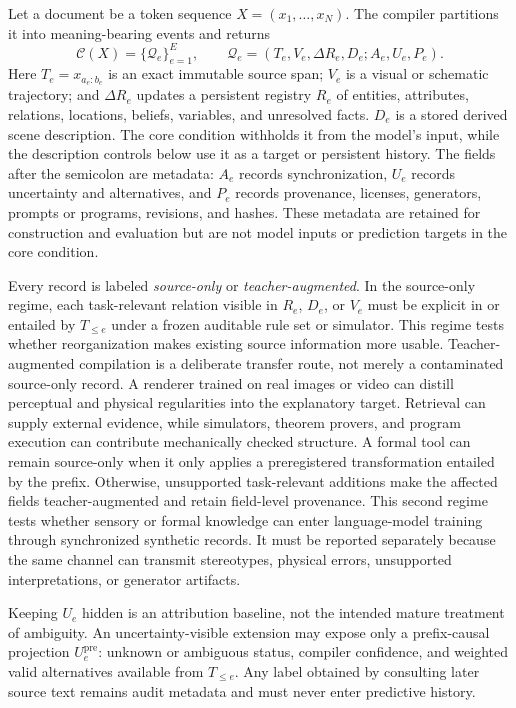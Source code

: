 \documentclass[11pt]{article}
\newcommand{\record}{\mathcal{Q}}
\newcommand{\compiler}{\mathcal{C}}
\begin{document}
Let a document be a token sequence $X=(x_1,\ldots,x_N)$. The compiler partitions it into meaning-bearing events and returns
\begin{equation}
  \compiler(X)=\{\record_e\}_{e=1}^{E}, \qquad
  \record_e=(T_e,V_e,\Delta R_e,D_e;A_e,U_e,P_e).
  \label{eq:record}
\end{equation}
Here $T_e=x_{a_e:b_e}$ is an exact immutable source span; $V_e$ is a visual or schematic trajectory; and $\Delta R_e$ updates a persistent registry $R_e$ of entities, attributes, relations, locations, beliefs, variables, and unresolved facts. $D_e$ is a stored derived scene description. The core condition withholds it from the model's input, while the description controls below use it as a target or persistent history. The fields after the semicolon are metadata: $A_e$ records synchronization, $U_e$ records uncertainty and alternatives, and $P_e$ records provenance, licenses, generators, prompts or programs, revisions, and hashes. These metadata are retained for construction and evaluation but are not model inputs or prediction targets in the core condition.

Every record is labeled \emph{source-only} or \emph{teacher-augmented}. In the source-only regime, each task-relevant relation visible in $R_e$, $D_e$, or $V_e$ must be explicit in or entailed by $T_{\le e}$ under a frozen auditable rule set or simulator. This regime tests whether reorganization makes existing source information more usable. Teacher-augmented compilation is a deliberate transfer route, not merely a contaminated source-only record. A renderer trained on real images or video can distill perceptual and physical regularities into the explanatory target. Retrieval can supply external evidence, while simulators, theorem provers, and program execution can contribute mechanically checked structure. A formal tool can remain source-only when it only applies a preregistered transformation entailed by the prefix. Otherwise, unsupported task-relevant additions make the affected fields teacher-augmented and retain field-level provenance. This second regime tests whether sensory or formal knowledge can enter language-model training through synchronized synthetic records. It must be reported separately because the same channel can transmit stereotypes, physical errors, unsupported interpretations, or generator artifacts.

Keeping $U_e$ hidden is an attribution baseline, not the intended mature treatment of ambiguity. An uncertainty-visible extension may expose only a prefix-causal projection $U_e^{\mathrm{pre}}$: unknown or ambiguous status, compiler confidence, and weighted valid alternatives available from $T_{\le e}$. Any label obtained by consulting later source text remains audit metadata and must never enter predictive history.
\end{document}
